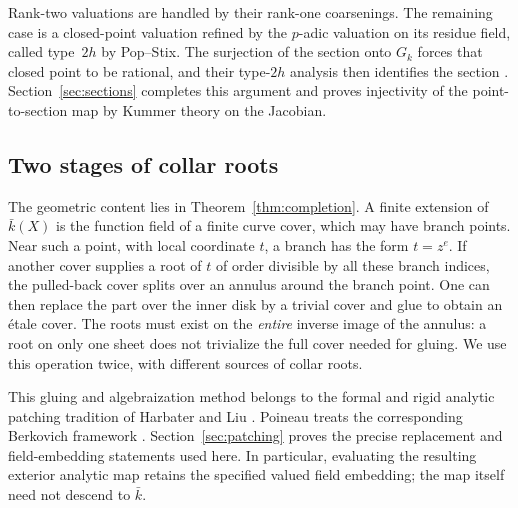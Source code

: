 Rank-two valuations are handled by their rank-one coarsenings. The
remaining case is a closed-point valuation refined by the $p$-adic
valuation on its residue field, called type~$2h$ by Pop--Stix.
The surjection of the section onto $G_k$ forces that closed point to
be rational, and their type-$2h$ analysis then identifies the section
\cite[preprint version, Section~6.1]{PopStix}.
Section~\ref{sec:sections} completes this argument and proves
injectivity of the point-to-section map by Kummer theory on the
Jacobian.

\subsection{Two stages of collar roots}

The geometric content lies in Theorem~\ref{thm:completion}.
A finite extension of $\bar k(X)$ is the function field of a finite
curve cover, which may have branch points. Near such a point, with
local coordinate $t$, a branch has the form $t=z^e$.
If another cover supplies a root of $t$ of order divisible by all
these branch indices, the pulled-back cover splits over an annulus
around the branch point. One can then replace the part over the inner
disk by a trivial cover and glue to obtain an \'etale cover.
The roots must exist on the \emph{entire} inverse image of the annulus:
a root on only one sheet does not trivialize the full cover needed
for gluing. We use this operation twice, with different sources of
collar roots.

This gluing and algebraization method belongs to the formal and rigid
analytic patching tradition of Harbater and Liu
\cite{HarbaterPatching,LiuPatching}. Poineau treats the corresponding
Berkovich framework \cite[Section~1 and Appendix~A]{GAGA}.
Section~\ref{sec:patching} proves the precise replacement and
field-embedding statements used here. In particular, evaluating the
resulting exterior analytic map retains the specified valued field
embedding; the map itself need not descend to $\bar k$.

